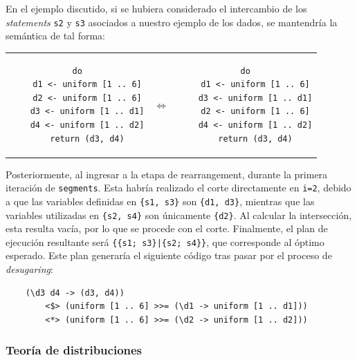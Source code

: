 \newpage

En el ejemplo discutido, si se hubiera considerado el intercambio de los \textit{statements} \verb|s2| y \verb|s3| asociados a nuestro ejemplo de los dados, se mantendría la semántica de tal forma:

\begin{tabular}{ccc}
    \begin{minipage}{0.4\textwidth}
        \begin{verbatim}
do
    d1 <- uniform [1 .. 6]
    d2 <- uniform [1 .. 6]
    d3 <- uniform [1 .. d1]
    d4 <- uniform [1 .. d2]
    return (d3, d4)
        \end{verbatim}
    \end{minipage}
    &
    \Large $\Leftrightarrow$
    &
    \begin{minipage}{0.3\textwidth}
        \begin{verbatim}
do
    d1 <- uniform [1 .. 6]
    d3 <- uniform [1 .. d1]
    d2 <- uniform [1 .. 6]
    d4 <- uniform [1 .. d2]
    return (d3, d4)
        \end{verbatim}
    \end{minipage}
\end{tabular}

Posteriormente, al ingresar a la etapa de \textit{}{rearrangement}, durante la primera iteración de \verb|segments|. Esta habría realizado el corte directamente en \verb|i=2|, debido a que las variables definidas en \verb|{s1, s3}| son \verb|{d1, d3}|, mientras que las variables utilizadas en \verb|{s2, s4}| son únicamente \verb|{d2}|. Al calcular la intersección, esta resulta vacía, por lo que se procede con el corte. Finalmente, el plan de ejecución resultante será \verb!{{s1; s3}|{s2; s4}}!, que corresponde al óptimo esperado. Este plan generaría el siguiente código tras pasar por el proceso de \textit{desugaring}:

\begin{verbatim}
    (\d3 d4 -> (d3, d4))
        <$> (uniform [1 .. 6] >>= (\d1 -> uniform [1 .. d1]))
        <*> (uniform [1 .. 6] >>= (\d2 -> uniform [1 .. d2]))
\end{verbatim}

\new

\subsubsection{Teoría de distribuciones}

